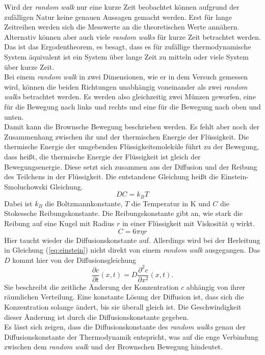 Wird der \emph{random walk} nur eine kurze Zeit beobachtet können aufgrund der zufälligen Natur keine genauen Aussagen gemacht werden. Erst für lange Zeitreihen werden sich die Messwerte an die theoretischen Werte annähern. Alternativ können aber auch viele \emph{random walks} für kurze Zeit betrachtet werden. Das ist das Ergodentheorem, es besagt, dass es für zufällige thermodynamische System äquivalent ist ein System über lange Zeit zu mitteln oder viele System über kurze Zeit.\\
Bei einem \emph{random walk} in zwei Dimensionen, wie er in dem Versuch gemessen wird, können die beiden Richtungen unabhängig voneinander als zwei \emph{random walks} betrachtet werden. Es werden also gleichzeitig zwei Münzen geworfen, eine für die Bewegung nach links und rechts und eine für die Bewegung nach oben und unten.\\


Damit kann die Brownsche Bewegung beschrieben werden. Es fehlt aber noch der Zusammenhang zwischen ihr und der thermischen Energie der Flüssigkeit. Die thermische Energie der umgebenden Flüssigkeitsmoleküle führt zu der Bewegung, dass heißt, die thermische Energie der Flüssigkeit ist gleich der Bewegungsenergie. Diese setzt sich zusammen aus der Diffusion und der Reibung des Teilchens in der Flüssigkeit. Die entstandene Gleichung heißt die  Einstein-Smoluchowski Gleichung.
\begin{equation}
  D C = k_B T \label{eq:einstein}
\end{equation}
Dabei ist $k_B$ die Boltzmannkonstante, $T$ die Temperatur in K und $C$ die Stokessche Reibungskonstante. Die Reibungskonstante gibt an, wie stark die Reibung auf eine Kugel mit Radius $r$ in einer Flüssigkeit mit Viskosität $\eta$ wirkt.
\begin{equation}
  C = 6 \pi \eta r
\end{equation}
Hier taucht wieder die Diffusionskonstante auf. Allerdings wird bei der Herleitung in Gleichung (\ref{eq:einstein}) nicht direkt von einem \emph{random walk} ausgegangen. Das $D$ kommt hier von der Diffusionsgleichung
\begin{equation}
  \frac{\partial c}{\partial t}(x, t) = D \frac{\partial^2 c}{\partial x^2} (x, t). \label{eq:diffusion}
\end{equation}
Sie beschreibt die zeitliche Änderung der Konzentration $c$ abhängig von ihrer räumlichen Verteilung. Eine konstante Lösung der Diffusion ist, dass sich die Konzentration solange ändert, bis sie überall gleich ist. Die Geschwindigkeit dieser Änderung ist durch die Diffusionskonstante gegeben.\\
Es lässt sich zeigen, dass die Diffusionskonstante des \emph{random walks} genau der Diffusionskonstante der Thermodynamik entspricht, was auf die enge Verbindung zwischen dem \emph{random walk} und der Brownschen Bewegung hindeutet.
